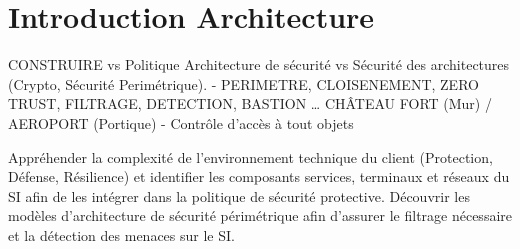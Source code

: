 


\section{Introduction Architecture}

CONSTRUIRE vs Politique Architecture de sécurité vs Sécurité des architectures (Crypto, Sécurité Perimétrique). - PERIMETRE, CLOISENEMENT, ZERO TRUST, FILTRAGE, DETECTION, BASTION  … CHÂTEAU FORT (Mur) / AEROPORT (Portique) - Contrôle d'accès à tout objets

Appréhender la complexité de l'environnement technique du client (Protection, Défense, Résilience) et identifier les composants services, terminaux et réseaux du SI afin de les intégrer dans la politique de sécurité protective.
Découvrir les modèles d'architecture de sécurité périmétrique afin d'assurer le filtrage nécessaire et la détection des menaces sur le SI.



